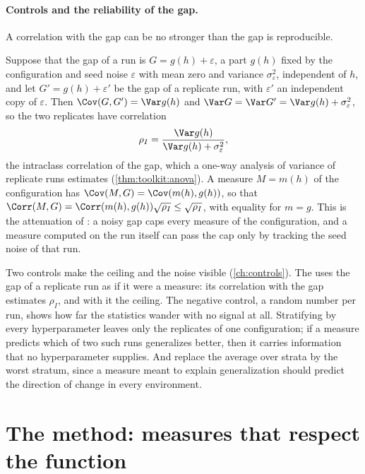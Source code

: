 \begin{refsection}
\paragraph{Controls and the reliability of the gap.} A correlation with the gap can be no stronger than the gap is reproducible.

\begin{remark}\label{rem:sharpness:ceiling}
Suppose that the gap of a run is $G=g(h)+\varepsilon$, a part $g(h)$ fixed by the configuration and seed noise $\varepsilon$ with mean zero and variance $\sigma_\varepsilon^2$, independent of $h$, and let $G'=g(h)+\varepsilon'$ be the gap of a replicate run, with $\varepsilon'$ an independent copy of $\varepsilon$. Then $\Cov(G,G')=\Var g(h)$ and $\Var G=\Var G'=\Var g(h)+\sigma_\varepsilon^2$, so the two replicates have correlation
\[
\rho_I=\frac{\Var g(h)}{\Var g(h)+\sigma_\varepsilon^2},
\]
the intraclass correlation of the gap, which a one-way analysis of variance of replicate runs estimates (\cref{thm:toolkit:anova}). A measure $M=m(h)$ of the configuration has $\Cov(M,G)=\Cov(m(h),g(h))$, so that $\Corr(M,G)=\Corr(m(h),g(h))\sqrt{\rho_I}\le\sqrt{\rho_I}$, with equality for $m=g$. This is the attenuation of \textcite{Spearman1904}: a noisy gap caps every measure of the configuration, and a measure computed on the run itself can pass the cap only by tracking the seed noise of that run.
\end{remark}

Two controls make the ceiling and the noise visible (\cref{ch:controls}). The  uses the gap of a replicate run as if it were a measure: its correlation with the gap estimates $\rho_I$, and with it the ceiling. The negative control, a random number per run, shows how far the statistics wander with no signal at all. Stratifying by every hyperparameter leaves only the replicates of one configuration; if a measure predicts which of two such runs generalizes better, then it carries information that no hyperparameter supplies. And \textcite{DziugaiteEtAl2020} replace the average over strata by the worst stratum, since a measure meant to explain generalization should predict the direction of change in every environment.

\section{The method: measures that respect the function}\label{sec:sharpness:invariance}


\end{refsection}
